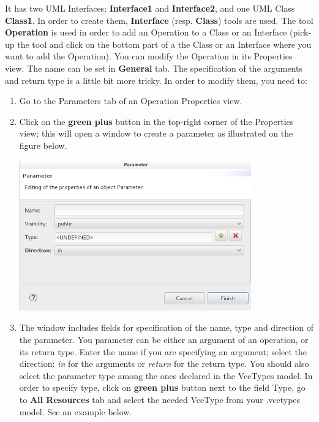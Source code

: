 \documentclass[12pt]{article}
\begin{document}
It has two UML Interfaces: \textbf{Interface1} and \textbf{Interface2}, and one UML Class \textbf{Class1}. In order to create them, \textbf{Interface} (resp. \textbf{Class}) tools are used.
The tool \textbf{Operation} is used in order to add an Operation to a Class or an Interface (pick-up the tool and click on the bottom part of a the Class or an Interface where you want to add the Operation). You can modify the Operation in its Properties view. The name can be set in \textbf{General} tab.  The specification of the arguments and return type is a little bit more tricky. In order to modify them, you need to:

\begin{enumerate}
\item
Go to the Parameters tab of an Operation Properties view.
\item
Click on the \textbf{green plus} button in the top-right corner of the Properties view; this will open a window to create a parameter as illustrated on the figure below.

     \centerline{
     \includegraphics[width=10cm]{draws/param-empty.png}
     \label{fig:vce-proj}
     }
     
\item
The window includes fields for specification of the name, type and direction of the parameter. You parameter can be either an argument of an operation, or its return type. Enter the name if you are specifying an argument; select the direction: \textit{in} for the arguments or \textit{return} for the return type. You should also select the parameter type among the ones declared in the VceTypes model. In order to specify type, click on \textbf{green plus} button next to the field Type, go to \textbf{All Resources} tab and select the needed VceType from your .vcetypes model. See an example below.


\end{enumerate}
\end{document}
